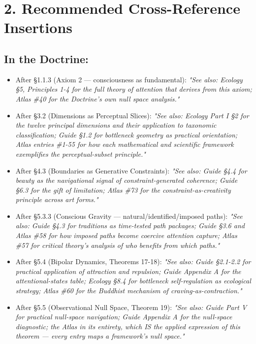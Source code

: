 \bigskip\noindent\makebox[\textwidth]{\color{rulegray}\rule{5cm}{0.3pt}}\bigskip


\section*{2. Recommended Cross-Reference Insertions}


\subsection*{In the Doctrine:}


\begin{itemize}[nosep,leftmargin=*]
  \item After §1.1.3 (Axiom 2 — consciousness as fundamental): \textit{"See also: Ecology §5, Principles 1-4 for the full theory of attention that derives from this axiom; Atlas \#40 for the Doctrine's own null space analysis."}
  \item After §3.2 (Dimensions as Perceptual Slices): \textit{"See also: Ecology Part I §2 for the twelve principal dimensions and their application to taxonomic classification; Guide §1.2 for bottleneck geometry as practical orientation; Atlas entries \#1-55 for how each mathematical and scientific framework exemplifies the perceptual-subset principle."}
  \item After §4.3 (Boundaries as Generative Constraints): \textit{"See also: Guide §4.4 for beauty as the navigational signal of constraint-generated coherence; Guide §6.3 for the gift of limitation; Atlas \#73 for the constraint-as-creativity principle across art forms."}
  \item After §5.3.3 (Conscious Gravity — natural/identified/imposed paths): \textit{"See also: Guide §4.3 for traditions as time-tested path packages; Guide §3.6 and Atlas \#58 for how imposed paths become coercive attention capture; Atlas \#57 for critical theory's analysis of who benefits from which paths."}
  \item After §5.4 (Bipolar Dynamics, Theorems 17-18): \textit{"See also: Guide §2.1-2.2 for practical application of attraction and repulsion; Guide Appendix A for the attentional-states table; Ecology §8.4 for bottleneck self-regulation as ecological strategy; Atlas \#60 for the Buddhist mechanism of craving-as-contraction."}
  \item After §5.5 (Observational Null Space, Theorem 19): \textit{"See also: Guide Part V for practical null-space navigation; Guide Appendix A for the null-space diagnostic; the Atlas in its entirety, which IS the applied expression of this theorem — every entry maps a framework's null space."}

\end{itemize}
